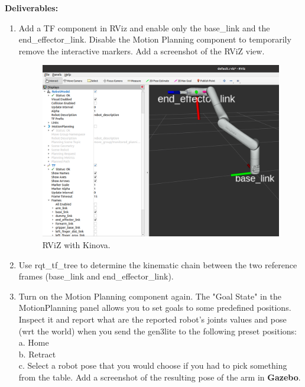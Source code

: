 \documentclass[12pt]{article}
\begin{document}
\textbf{Deliverables:}
\begin{enumerate}
    \item Add a TF component in RViz and enable only the base\_link and the end\_effector\_link. Disable the Motion Planning component to temporarily remove the interactive markers. Add a screenshot of the RViZ view.
    
    \begin{figure}[h]
        \centering\includegraphics[width=14cm]{images/kinova_rviz.png}\vspace{-4pt}
        \caption{RViZ with Kinova.}\label{fig:kinova_rviz}
        \end{figure}

    \item Use rqt\_tf\_tree to determine the kinematic chain between the two reference frames (base\_link and end\_effector\_link).
    
    \item Turn on the Motion Planning component again. The "Goal State" in the MotionPlanning panel allows you to set goals to some predefined positions. Inspect it and report what are the reported robot’s joints values and pose (wrt the world) when you send the gen3lite to the following preset positions:\\
    a. Home\\
    b. Retract\\
    c. Select a robot pose that you would choose if you had to pick something from the table. Add a screenshot of the resulting pose of the arm in \textbf{Gazebo}.
\end{enumerate}
\end{document}
